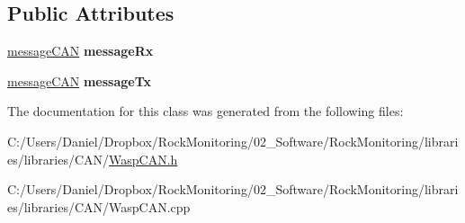 \subsection*{Public Attributes}
\begin{DoxyCompactItemize}
\item 
\hyperlink{struct_wasp_c_a_n_1_1message_c_a_n}{message\+C\+AN} {\bfseries message\+Rx}\hypertarget{class_wasp_c_a_n_a38270ad393db524f71d99e62f901871a}{}\label{class_wasp_c_a_n_a38270ad393db524f71d99e62f901871a}

\item 
\hyperlink{struct_wasp_c_a_n_1_1message_c_a_n}{message\+C\+AN} {\bfseries message\+Tx}\hypertarget{class_wasp_c_a_n_a658922136594379a25aa4da2dc890257}{}\label{class_wasp_c_a_n_a658922136594379a25aa4da2dc890257}

\end{DoxyCompactItemize}


The documentation for this class was generated from the following files\+:\begin{DoxyCompactItemize}
\item 
C\+:/\+Users/\+Daniel/\+Dropbox/\+Rock\+Monitoring/02\+\_\+\+Software/\+Rock\+Monitoring/libraries/libraries/\+C\+A\+N/\hyperlink{_wasp_c_a_n_8h}{Wasp\+C\+A\+N.\+h}\item 
C\+:/\+Users/\+Daniel/\+Dropbox/\+Rock\+Monitoring/02\+\_\+\+Software/\+Rock\+Monitoring/libraries/libraries/\+C\+A\+N/Wasp\+C\+A\+N.\+cpp\end{DoxyCompactItemize}
